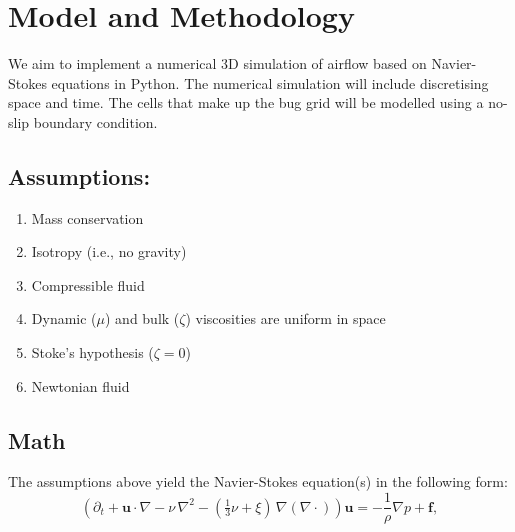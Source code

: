 \section{Model and Methodology} \label{section: methods}
We aim to implement a numerical 3D simulation of airflow based on Navier-Stokes equations in Python. The numerical simulation will include discretising space and time. The cells that make up the bug grid will be modelled using a no-slip boundary condition.

\subsection{Assumptions:}
\begin{multicols}{2}
\begin{enumerate}
    \item Mass conservation
    \item Isotropy (i.e., no gravity)
    \item Compressible fluid
    \item Dynamic ($\mu$) and bulk ($\zeta$) viscosities are uniform in space
    \item Stoke's hypothesis ($\zeta=0$)
    \item Newtonian fluid
\end{enumerate}
\end{multicols}

\subsection{Math}
The assumptions above yield the Navier-Stokes equation(s) \cite{batchelor2000introduction} in the following form:
\begin{equation}
{\left(\partial_t +\mathbf {u} \cdot \nabla -\nu \,\nabla ^{2}-({\tfrac {1}{3}}\nu +\xi )\,\nabla (\nabla \cdot )\right)\mathbf {u} =-{\frac {1}{\rho }}\nabla p+\mathbf {f} ,}
\end{equation}

